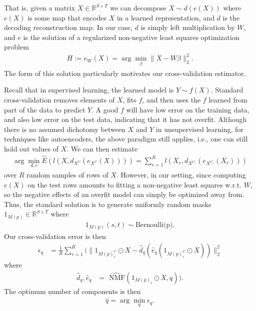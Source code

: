 That is, given a matrix $X \in \mathbb R^{S \times T}$ we can decompose $X \sim d(e(X))$ where $e(X)$ is some map that encodes $X$ in a learned representation, and $d$ is the decoding reconstruction map.
In our case, $d$ is simply left multiplication by $W$, and $e$ is the solution of a regularized non-negative least squares optimization problem
\begin{align*}
H := e_W(X) = \arg \min_{\beta} \|X - W \beta\|_2^2.
\end{align*}
The form of this solution particularly motivates our cross-validation estimator.

Recall that in supervised learning, the learned model is $Y \sim f(X)$.
Standard cross-validation removes elements of $X$, fits $f$, and then uses the $f$ learned from part of the data to predict $Y$.
A good $f$ will have low error on the training data, and also low error on the test data, indicating that it has not overfit.
Although there is no assumed dichotomy between $X$ and $Y$ in unsupervised learning, for techniques like autoencoders, the above paradigm still applies, i.e., one can still hold out values of $X$.
We can then estimate 
\begin{align*}
\arg \min_{d,e} \widehat E(l(X, d_{X^C}(e_{X^C}(X)))) = \sum_{r=  1}^R l(X_r, d_{X^{C_r}}(e_{X^{C_r}}(X_r)))
\end{align*}
over $R$ random samples of rows of $X$.
However, in our setting, since computing $e(X)$ on the test rows amounts to fitting a non-negative least squares w.r.t. $W$, so the negative effects of an overfit model can simply be optimized away from.
Thus,  the standard solution is to generate uniformly random masks $1_{M(p)} \in \mathbb R^{S \times T}$ where
\begin{align*}
1_{M(p)} (s,t) \sim \text{Bernoulli(p)}.
\end{align*}
Our cross-validation error is then
\begin{align*}
\epsilon_q &= \frac{1}{R} \sum_{r = 1}^R (\|1_{M(p)_r^C} \odot X - \widehat d_q(\widehat e_q (1_{M(p)_r^C} \odot X ))\|_2^2 
\end{align*}
where
\begin{align*}
\widehat d_q, \widehat e_q &= \widehat{\text{ NMF}}(1_{M(p)_r} \odot X, q)).
\end{align*}
The optimum number of components is then
\begin{align*}
    \widehat q = \arg \min_q \epsilon_q.
\end{align*}

